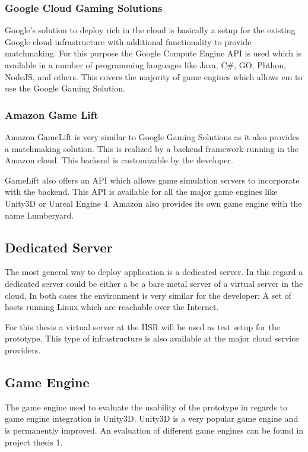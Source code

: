 \subsubsection{Google Cloud Gaming Solutions}

Google's solution to deploy rich \ogs{} in the cloud is basically a setup
for the existing Google cloud infrastructure with additional functionality to
provide matchmaking. For this purpose the Google Compute Engine API is used
which is available in a number of programming languages like Java, C\#, GO,
Phthon, NodeJS, and others. This covers the majority of game engines which
allows em to use the Google Gaming Solution.

\subsubsection{Amazon Game Lift}

Amazon GameLift is very similar to Google Gaming Solutions as it also provides
a matchmaking solution. This is realized by a backend framework running in the
Amazon cloud. This backend is customizable by the developer. 

GameLift also offers an API which allows game simulation servers to incorporate
with the backend. This API is available for all the major game engines
like Unity3D or Unreal Engine 4. Amazon also provides its own game engine with
the name Lumberyard.

\subsection{Dedicated Server}

The most general way to deploy \ms{} application is a dedicated server. In this
regard a dedicated server could be either a be a bare metal server of a virtual
server in the cloud. In both cases the environment is very similar for the
developer: A set of hosts running Linux which are reachable over the Internet.

For this thesis a virtual server at the HSR will be used as test setup for the
prototype. This type of infrastructure is also available at the major cloud
service providers.

\subsection{Game Engine}

The game engine used to evaluate the usability of the prototype in regards to
game engine integration is Unity3D. Unity3D is a very popular game engine and is
permanently improved. An evaluation of different game engines can be found in
project thesis 1.


